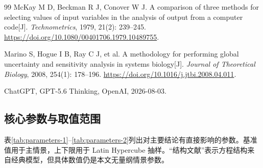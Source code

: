 \documentclass[withoutpreface,bwprint]{cumcmthesis}
\begin{document}
\begin{thebibliography}{99}
McKay M D, Beckman R J, Conover W J. A comparison of three methods for selecting values of input variables in the analysis of output from a computer code[J].
\textit{Technometrics}, 1979, 21(2): 239--245.
\url{https://doi.org/10.1080/00401706.1979.10489755}.

Marino S, Hogue I B, Ray C J, et al. A methodology for performing global uncertainty and sensitivity analysis in systems biology[J].
\textit{Journal of Theoretical Biology}, 2008, 254(1): 178--196.
\url{https://doi.org/10.1016/j.jtbi.2008.04.011}.


ChatGPT, GPT-5.6 Thinking, OpenAI, 2026-08-03.

\end{thebibliography}

\begin{appendices}
\renewcommand{\thesubsection}{\Alph{section}.\arabic{subsection}}
\renewcommand{\theHsubsection}{appendix.\Alph{section}.\arabic{subsection}}

\section{核心参数与取值范围}

表\ref{tab:parameters-1}--\ref{tab:parameters-2}列出对主要结论有直接影响的参数。基准值用于主情景，上下限用于 Latin Hypercube 抽样。“结构文献”表示方程结构来自经典模型，但具体数值仍是本文无量纲情景参数。


\end{appendices}
\end{document}
